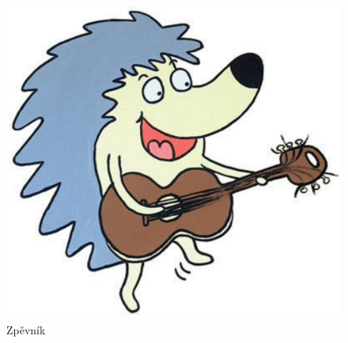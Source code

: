 \documentclass[a5paper, 10pt, onecolumn]{article}
\begin{document}



\begin{titlepage}
	\begin{figure}[h!]
	\begin{center}
		\includegraphics[scale=0.65]{jezek.png}\\
		\vspace{5em}
		{\fontsize{80}{90}\Fontskrivan\selectfont Zpěvník}
	\end{center}
	\end{figure}
\end{titlepage}
\end{document}
